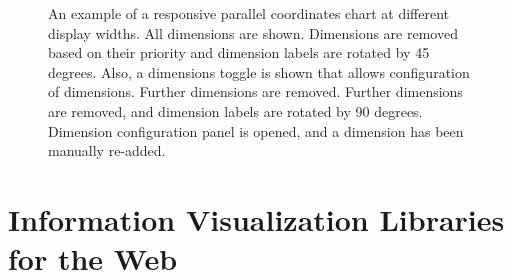 \begin{figure}[tp]
{
An example of a responsive parallel coordinates chart at different display widths.  All dimensions are shown.  Dimensions are removed based on their priority and dimension labels are rotated by 45 degrees. Also, a dimensions toggle is shown that allows configuration of dimensions.  Further dimensions are removed.  Further dimensions are removed, and dimension labels are rotated by 90 degrees.  Dimension configuration panel is opened, and a dimension has been manually re-added.
}
\label{fig:RespParCoordExample}
\end{figure}


\section{Information Visualization Libraries for the Web}

